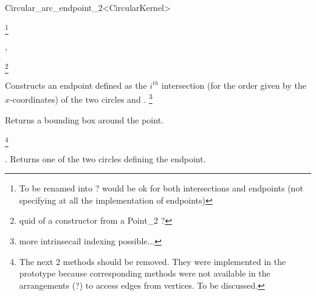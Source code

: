 \begin{ccRefClass}{Circular_arc_endpoint_2<CircularKernel>}

\footnote{To be renamed into ? would be ok for both intersections and endpoints (not specifying at all the implementation of endpoints)}

\ccDefinition


\ccParameters


\ccIsModel

, 

\ccCreation
{}

\ccThreeToTwo

\footnote{quid of a constructor from a Point\_2 ?}

{Constructs an endpoint defined as the $i^{th}$ intersection (for the 
order given by the $x$-coordinates) of the two circles  and .} 
\footnote{more intrinsecail indexing possible...}

\ccAccessFunctions

\ccThreeToTwo

\ccGlue
{}

{Returns a bounding box around the point.}

\footnote{The next 2 methods should be removed. They were implemented 
in the prototype because corresponding methods were not available in 
the arrangements (?) to access edges from vertices. To be discussed.}

{. Returns one of the two circles defining the endpoint.}
\ccGlue
{}



\end{ccRefClass}
